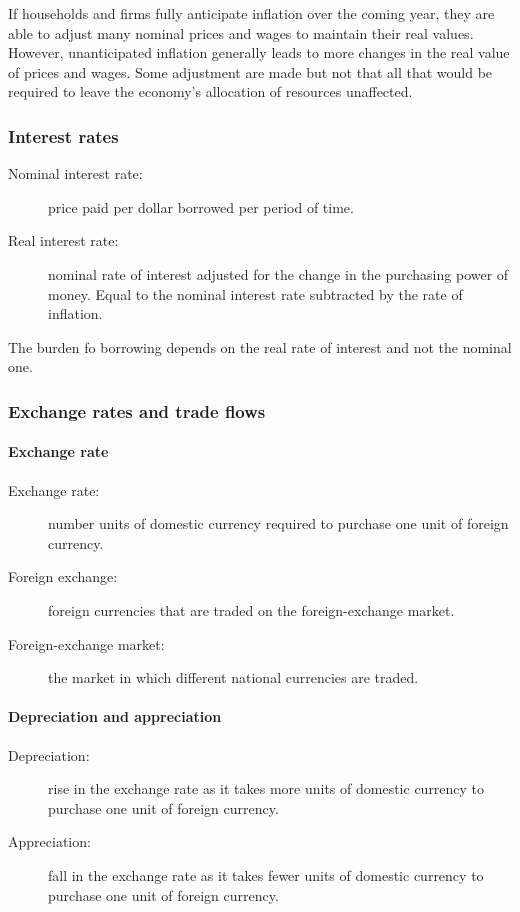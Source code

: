 \documentclass[10pt, twocolumn]{article}
\begin{document}
If households and firms fully anticipate inflation over the coming year, they are able to adjust many nominal prices and wages to maintain their real values.
However, unanticipated inflation generally leads to more changes in the real value of prices and wages.
Some adjustment are made but not that all that would be required to leave the economy's allocation of resources unaffected.


\subsubsection{Interest rates}
\begin{description}
  \item[Nominal interest rate:] price paid per dollar borrowed per period of time.
  \item[Real interest rate:] nominal rate of interest adjusted for the change in the purchasing power of money.
        Equal to the nominal interest rate subtracted by the rate of inflation.
\end{description}

The burden fo borrowing depends on the real rate of interest and not the nominal one.


\subsubsection{Exchange rates and trade flows}
\paragraph{Exchange rate}
\begin{description}
  \item[Exchange rate:] number units of domestic currency required to purchase one unit of foreign currency.
  \item[Foreign exchange:] foreign currencies that are traded on the foreign-exchange market.
  \item[Foreign-exchange market:] the market in which different national currencies are traded.
\end{description}

\paragraph{Depreciation and appreciation}
\begin{description}
  \item[Depreciation:] rise in the exchange rate as it takes more units of domestic currency to purchase one unit of foreign currency.
  \item[Appreciation:] fall in the exchange rate as it takes fewer units of domestic currency to purchase one unit of foreign currency.
\end{description}
\end{document}

